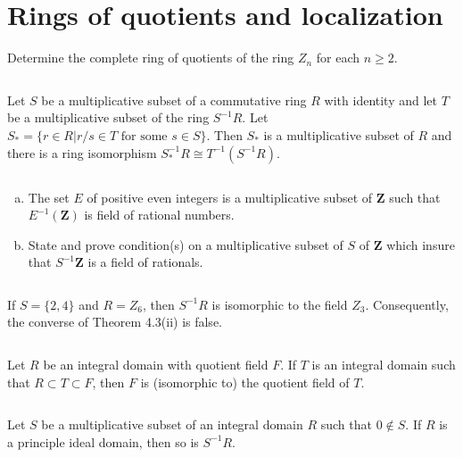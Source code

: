 \section{Rings of quotients and localization}
\begin{ex}
    Determine the complete ring of quotients of the ring $Z_{n}$ for each $n\geq 2$.
\end{ex}

$$ $$

\begin{ex}
    Let $S$ be a multiplicative subset of a commutative ring $R$ with identity and let $T$ be a multiplicative subset of the ring $S^{-1}R$. Let $S_{*}=\{r\in R|r /s\in T \text{ for some }s\in S\}$. Then $S_{*}$ is a multiplicative subset of $R$ and there is a ring isomorphism $S_{*}^{-1}R\cong T^{-1}(S^{-1}R)$.
\end{ex}

$$ $$

\begin{ex}
    \begin{enumerate}[(a)]
        \item The set $E$ of positive even integers is a multiplicative subset of $\mathbf{Z}$ such that $E^{-1}(\mathbf{Z})$ is field of rational numbers.
        \item State and prove condition(s) on a multiplicative subset of $S$ of $\mathbf{Z}$ which insure that $S^{-1}\mathbf{Z}$ is a field of rationals.
    \end{enumerate}
\end{ex}

$$ $$

\begin{ex}
    If $S=\{2,4\}$ and $R=Z_{6}$, then $S^{-1}R$ is isomorphic to the field $Z_{3}$. Consequently, the converse of Theorem 4.3(ii) is false.
\end{ex}

$$ $$

\begin{ex}
    Let $R$ be an integral domain with quotient field $F$. If $T$ is an integral domain such that $R\subset T\subset F$, then $F$ is (isomorphic to) the quotient field of $T$.
\end{ex}

$$ $$

\begin{ex}
    Let $S$ be a multiplicative subset of an integral domain $R$ such that $0\notin S$. If $R$ is a principle ideal domain, then so is $S^{-1}R$.
\end{ex}

